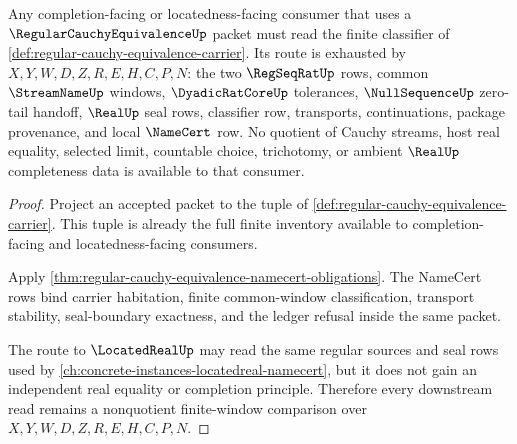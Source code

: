 \begin{theorem}
\label{thm:regular-cauchy-equivalence-sibling-route}
Any completion-facing or locatedness-facing consumer that uses a $\RegularCauchyEquivalenceUp$ packet must read the finite classifier of \autoref{def:regular-cauchy-equivalence-carrier}. Its route is exhausted by $X,Y,W,D,Z,R,E,H,C,P,N$: the two $\RegSeqRatUp$ rows, common $\StreamNameUp$ windows, $\DyadicRatCoreUp$ tolerances, $\NullSequenceUp$ zero-tail handoff, $\RealUp$ seal rows, classifier row, transports, continuations, package provenance, and local $\NameCert$ row. No quotient of Cauchy streams, host real equality, selected limit, countable choice, trichotomy, or ambient $\RealUp$ completeness data is available to that consumer.
\end{theorem}
\begin{proof}
Project an accepted packet to the tuple of \autoref{def:regular-cauchy-equivalence-carrier}. This tuple is already the full finite inventory available to completion-facing and locatedness-facing consumers.

Apply \autoref{thm:regular-cauchy-equivalence-namecert-obligations}. The NameCert rows bind carrier habitation, finite common-window classification, transport stability, seal-boundary exactness, and the ledger refusal inside the same packet.

The route to $\LocatedRealUp$ may read the same regular sources and seal rows used by \autoref{ch:concrete-instances-locatedreal-namecert}, but it does not gain an independent real equality or completion principle. Therefore every downstream read remains a nonquotient finite-window comparison over $X,Y,W,D,Z,R,E,H,C,P,N$.
\end{proof}

